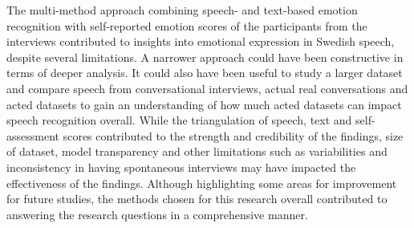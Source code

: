 \medskip
The multi-method approach combining speech- and text-based emotion recognition with self-reported emotion scores of the participants from the interviews contributed to insights into emotional expression in Swedish speech, despite several limitations. A narrower approach could have been constructive in terms of deeper analysis. It could also have been useful to study a larger dataset and compare speech from conversational interviews, actual real conversations and acted datasets to gain an understanding of how much acted datasets can impact speech recognition overall.  
While the triangulation of speech, text and self-assessment scores contributed to the strength and credibility of the findings, size of dataset, model transparency and other limitations such as variabilities and inconsistency in having spontaneous interviews may have impacted the effectiveness of the findings. Although highlighting some areas for improvement for future studies, the methods chosen for this research overall contributed to answering the research questions in a comprehensive manner.
